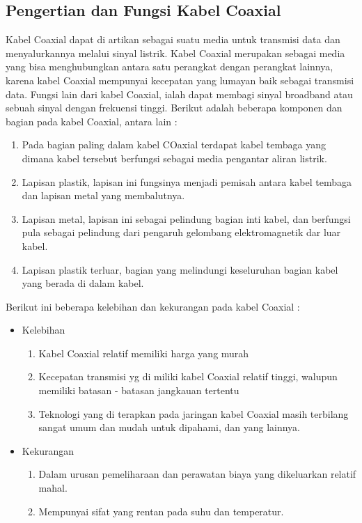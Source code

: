 \begin{itemize}
\begin{itemize}
	\subsection{Pengertian dan Fungsi Kabel Coaxial}
	Kabel Coaxial dapat di artikan sebagai suatu media untuk transmisi data dan menyalurkannya melalui sinyal listrik. Kabel Coaxial merupakan sebagai media yang bisa menghubungkan antara satu perangkat dengan perangkat lainnya, karena kabel Coaxial mempunyai kecepatan yang lumayan baik sebagai transmisi data. Fungsi lain dari kabel Coaxial, ialah dapat membagi sinyal broadband atau sebuah sinyal dengan frekuensi tinggi. Berikut adalah beberapa komponen dan bagian pada kabel Coaxial, antara lain :
		\begin{enumerate}
			\item Pada bagian paling dalam kabel COaxial terdapat kabel tembaga yang dimana kabel tersebut berfungsi sebagai media pengantar aliran listrik.
			\item Lapisan plastik, lapisan ini fungsinya menjadi pemisah antara kabel tembaga dan lapisan metal yang membalutnya.
			\item Lapisan metal, lapisan ini sebagai pelindung bagian inti kabel, dan berfungsi pula sebagai pelindung dari pengaruh gelombang elektromagnetik dar luar kabel.
			\item Lapisan plastik terluar, bagian yang melindungi keseluruhan bagian kabel yang berada di dalam kabel.
		\end{enumerate}
	Berikut ini beberapa kelebihan dan kekurangan pada kabel Coaxial :
		\begin{itemize}
			\item Kelebihan
				\begin{enumerate}
					\item Kabel Coaxial relatif memiliki harga yang murah
					\item Kecepatan transmisi yg di miliki kabel Coaxial relatif tinggi, walupun memiliki batasan - batasan jangkauan tertentu
					\item Teknologi yang di terapkan pada jaringan kabel Coaxial masih terbilang sangat umum dan mudah untuk dipahami, dan yang lainnya.
				\end{enumerate}
			\item Kekurangan
				\begin{enumerate}
					\item Dalam urusan pemeliharaan dan perawatan biaya yang dikeluarkan relatif mahal.
					\item Mempunyai sifat yang rentan pada suhu dan temperatur.

\end{enumerate}
\end{itemize}
\end{itemize}
\end{itemize}
